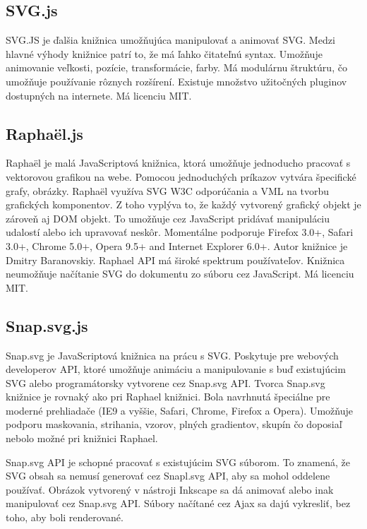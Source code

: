 \subsection{SVG.js}

SVG.JS je ďalšia knižnica umožňujúca manipulovať a animovať SVG. Medzi hlavné výhody knižnice patrí to, že má ľahko čitateľnú syntax. Umožňuje animovanie veľkosti, pozície, transformácie, farby. Má modulárnu štruktúru, čo umožňuje používanie rôznych rozšírení. Existuje množstvo užitočných pluginov dostupných na internete. \cite{svgjs}
Má licenciu MIT. 

\subsection{Raphaël.js}

Raphaël je malá JavaScriptová knižnica, ktorá umožňuje jednoducho pracovať s vektorovou grafikou na webe. Pomocou jednoduchých príkazov vytvára špecifické grafy, obrázky.  Raphaël využíva \acs{SVG} \acs{W3C} odporúčania a \acs{VML} na tvorbu grafických komponentov. Z toho vyplýva to, že každý vytvorený grafický objekt je zároveň aj DOM objekt. To umožňuje cez JavaScript pridávať manipuláciu udalostí alebo ich upravovať neskôr. Momentálne podporuje Firefox 3.0+, Safari 3.0+, Chrome 5.0+, Opera 9.5+ and Internet Explorer 6.0+.\cite{Raphael}
Autor knižnice je Dmitry Baranovskiy. Raphael \acs{API} má široké spektrum používateľov. Knižnica neumožňuje načítanie SVG do dokumentu zo súboru cez JavaScript. Má licenciu MIT. 

\subsection{Snap.svg.js}

Snap.svg je JavaScriptová knižnica na prácu s SVG. Poskytuje pre webových developerov \acs{API}, ktoré umožňuje animáciu a manipulovanie s buď existujúcim SVG alebo programátorsky vytvorene cez Snap.svg API. Tvorca Snap.svg knižnice je rovnaký ako pri Raphael knižnici.  Bola navrhnutá špeciálne pre moderné prehliadače (IE9 a vyššie, Safari, Chrome, Firefox a Opera). Umožňuje podporu maskovania, strihania, vzorov, plných gradientov, skupín čo doposiaľ nebolo možné pri knižnici Raphael. 

Snap.svg API je schopné pracovať s existujúcim SVG súborom. To znamená, že SVG obsah sa nemusí  generovať cez Snapl.svg API, aby sa mohol oddelene používať. Obrázok vytvorený v nástroji  Inkscape sa dá animovať alebo inak manipulovať cez Snap.svg API. Súbory načítané cez Ajax sa dajú vykresliť, bez toho, aby boli renderované. 

